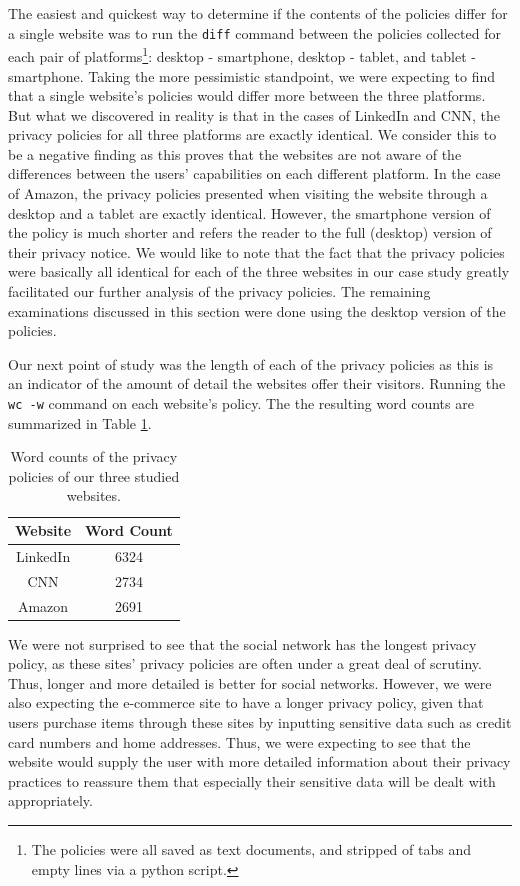 \documentclass{acm_proc_article-sp}
\begin{document}
The easiest and quickest way to determine if the contents of the policies differ for a single website was to run the \texttt{diff} command between the policies collected for each pair of platforms\footnote{The policies were all saved as text documents, and stripped of tabs and empty lines via a python script.}: desktop - smartphone, desktop - tablet, and tablet - smartphone. Taking the more pessimistic standpoint, we were expecting to find that a single website's policies would differ more between the three platforms. But what we discovered in reality is that in the cases of LinkedIn and CNN, the privacy policies for all three platforms are exactly identical. We consider this to be a negative finding as this proves that the websites are not aware of the differences between the users' capabilities on each different platform. In the case of Amazon, the privacy policies presented when visiting the website through a desktop and a tablet are exactly identical. However, the smartphone version of the policy is much shorter and refers the reader to the full (desktop) version of their privacy notice. We would like to note that the fact that the privacy policies were basically all identical for each of the three websites in our case study greatly facilitated our further analysis of the privacy policies. The remaining examinations discussed in this section were done using the desktop version of the policies.

Our next point of study was the length of each of the privacy policies as this is an indicator of the amount of detail the websites offer their visitors. Running the \texttt{wc -w} command on each website's policy. The the resulting word counts are summarized in Table \ref{tab:wc}.

\begin{table}[h]
  \centering
  \caption{Word counts of the privacy policies of our three studied websites.}
    \begin{tabular}{|c|c|}
    \hline
    \textbf{Website} & \textbf{Word Count} \\    
     \hline
     LinkedIn & 6324 \\
     CNN & 2734 \\
     Amazon & 2691 \\
     \hline
    \end{tabular}%
  \label{tab:wc}%
\end{table}%

We were not surprised to see that the social network has the longest privacy policy, as these sites' privacy policies are often under a great deal of scrutiny. Thus, longer and more detailed is better for social networks. However, we were also expecting the e-commerce site to have a longer privacy policy, given that users purchase items through these sites by inputting sensitive data such as credit card numbers and home addresses. Thus, we were expecting to see that the website would supply the user with more detailed information about their privacy practices to reassure them that especially their sensitive data will be dealt with appropriately.
\end{document}
